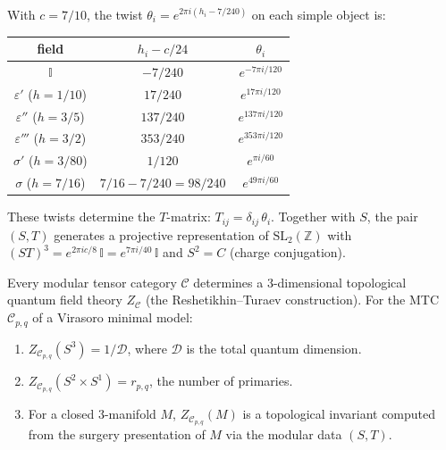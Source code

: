 \begin{computation}\label{comp:twist-5-4}
With $c = 7/10$, the twist $\theta_i = e^{2\pi i(h_i - 7/240)}$ on each simple
object is:
\begin{center}
\renewcommand{\arraystretch}{1.2}
\begin{tabular}{ccc}
\hline
field & $h_i - c/24$ & $\theta_i$ \\
\hline
$\mathbb{I}$ & $-7/240$ & $e^{-7\pi i/120}$ \\
$\varepsilon'$ ($h = 1/10$) & $17/240$ & $e^{17\pi i/120}$ \\
$\varepsilon''$ ($h = 3/5$) & $137/240$ & $e^{137\pi i/120}$ \\
$\varepsilon'''$ ($h = 3/2$) & $353/240$ & $e^{353\pi i/120}$ \\
$\sigma'$ ($h = 3/80$) & $1/120$ & $e^{\pi i/60}$ \\
$\sigma$ ($h = 7/16$) & $7/16 - 7/240 = 98/240$ & $e^{49\pi i/60}$ \\
\hline
\end{tabular}
\end{center}
These twists determine the $T$-matrix: $T_{ij} = \delta_{ij}\,\theta_i$.
Together with $S$, the pair $(S, T)$ generates a projective representation
of $\mathrm{SL}_2(\mathbb{Z})$ with $(ST)^3 = e^{2\pi i c/8}\,\mathbb{I} =
e^{7\pi i/40}\,\mathbb{I}$ and $S^2 = C$ (charge conjugation).
\end{computation}

\begin{theorem}\label{thm:mtc-tqft}
Every modular tensor category $\mathcal{C}$ determines a $3$-dimensional
topological quantum field theory $Z_{\mathcal{C}}$ (the Reshetikhin--Turaev
construction).  For the MTC $\mathcal{C}_{p,q}$ of a Virasoro minimal model:
\begin{enumerate}
\item $Z_{\mathcal{C}_{p,q}}(S^3) = 1/\mathcal{D}$, where $\mathcal{D}$ is the total quantum dimension.
\item $Z_{\mathcal{C}_{p,q}}(S^2 \times S^1) = r_{p,q}$, the number of primaries.
\item For a closed $3$-manifold $M$, $Z_{\mathcal{C}_{p,q}}(M)$ is a topological
invariant computed from the surgery presentation of $M$ via the modular data
$(S, T)$.
\end{enumerate}
\end{theorem}

